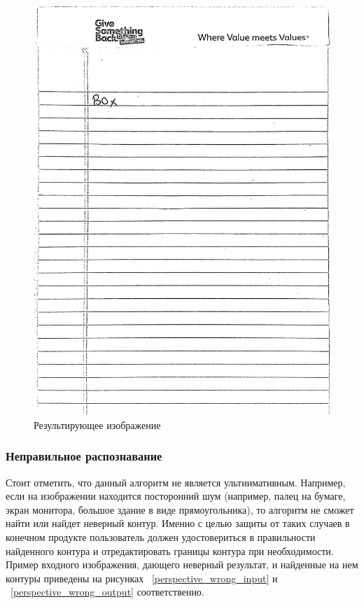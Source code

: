 \begin{figure}
    \includegraphics[scale=0.15]{img/perspective/output.JPG}
    \caption{Результирующее изображение}
    \label{preprocess_out}
\end{figure}

\subsubsection{Неправильное распознавание}
Стоит отметить, что данный алгоритм не является ультиимативным. Например, если на изображении находится посторонний шум (например, палец на бумаге, экран монитора, большое здание в виде прямоугольника), 
то алгоритм не сможет найти или найдет неверный контур. Именно с целью защиты от таких случаев в конечном продукте пользователь должен удостовериться в правильности найденного контура и отредактировать границы контура при необходимости.
Пример входного изображения, дающего неверный результат, и найденные на нем контуры приведены на рисунках ~\ref{perspective_wrong_input} и ~\ref{perspective_wrong_output} соответственно.

